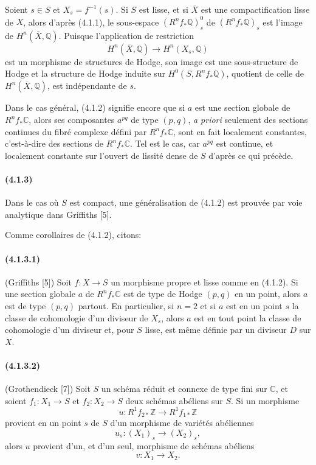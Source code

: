 \documentclass[10pt]{article}
\newcommand{\C}{\mathbb C}
\newcommand{\Q}{\mathbb Q}
\newcommand{\Z}{\mathbb Z}
\begin{document}
Soient $s\in S$ et $X_s=f^{-1}(s)$. Si $S$ est lisse, et si $\overline X$ est une compactification lisse de $X$, alors d'après (4.1.1), le sous-espace $(R^nf_*\Q)^0_s$ de $(R^nf_*\Q)_s$ est l'image de $H^n(\overline X,\Q)$. Puisque l'application de restriction
\[
H^n(\overline X,\Q)\longrightarrow H^n(X_s,\Q)
\]
est un morphisme de structures de Hodge, son image est une sous-structure de Hodge et la structure de Hodge induite sur $H^0(S,R^nf_*\Q)$, quotient de celle de $H^n(\overline X,\Q)$, est indépendante de $s$.

Dans le cas général, (4.1.2) signifie encore que si $a$ est une section globale de $R^nf_*\C$, alors ses composantes $a^{pq}$ de type $(p,q)$, \emph{a priori} seulement des sections continues du fibré complexe défini par $R^nf_*\C$, sont en fait localement constantes, c'est-à-dire des sections de $R^nf_*\C$. Tel est le cas, car $a^{pq}$ est continue, et localement constante sur l'ouvert de lissité dense de $S$ d'après ce qui précède.

\paragraph{(4.1.3)} Dans le cas où $S$ est compact, une généralisation de (4.1.2) est prouvée par voie analytique dans Griffiths [5].

Comme corollaires de (4.1.2), citons:

\paragraph{(4.1.3.1)} (Griffiths [5]) Soit $f:X\to S$ un morphisme propre et lisse comme en (4.1.2). Si une section globale $a$ de $R^nf_*\C$ est de type de Hodge $(p,q)$ en un point, alors $a$ est de type $(p,q)$ partout. En particulier, si $n=2$ et si $a$ est en un point $s$ la classe de cohomologie d'un diviseur de $X_s$, alors $a$ est en tout point la classe de cohomologie d'un diviseur et, pour $S$ lisse, est même définie par un diviseur $D$ sur $X$.

\paragraph{(4.1.3.2)} (Grothendieck [7]) Soit $S$ un schéma réduit et connexe de type fini sur $\C$, et soient $f_1:X_1\to S$ et $f_2:X_2\to S$ deux schémas abéliens sur $S$. Si un morphisme
\[
u:R^1f_{2*}\Z\longrightarrow R^1f_{1*}\Z
\]
provient en un point $s$ de $S$ d'un morphisme de variétés abéliennes
\[
u_s:(X_1)_s\longrightarrow (X_2)_s,
\]
alors $u$ provient d'un, et d'un seul, morphisme de schémas abéliens
\[
v:X_1\longrightarrow X_2.
\]
\end{document}
